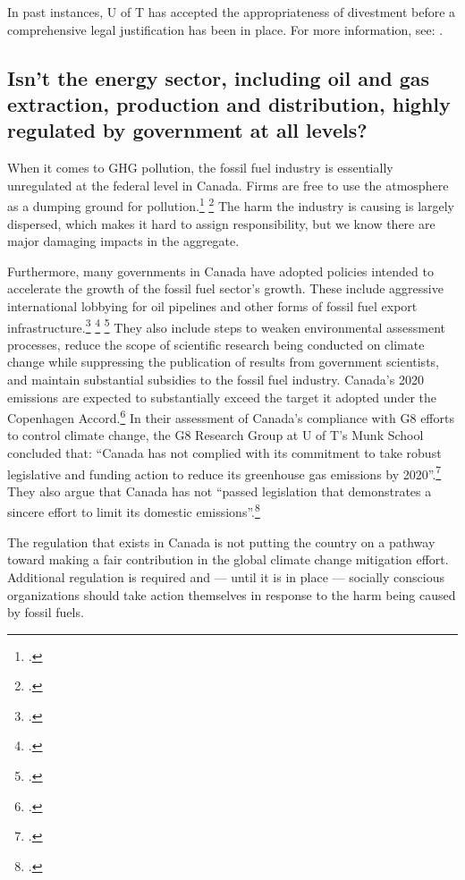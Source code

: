 \documentclass[10pt]{article}
\begin{document}
In past instances, U of T has accepted the appropriateness of divestment before a comprehensive legal justification has been in place.
For more information, see: .


	
	\subsection{Isn't the energy sector, including oil and gas extraction, production and distribution, highly regulated by government at all levels?}
	\label{HeavilyRegulated}
	


When it comes to GHG pollution, the fossil fuel industry is essentially unregulated at the federal level in Canada.
Firms are free to use the atmosphere as a dumping ground for  pollution.\footcite[See: ][]{Paris2013} \footcite[See also: ][]{Stewart2013}
The harm the industry is causing is largely dispersed, which makes it hard to assign responsibility, but we know there are major damaging impacts in the aggregate.



Furthermore, many governments in Canada have adopted policies intended to accelerate the growth of the fossil fuel sector's growth.
These include aggressive international lobbying for oil pipelines and other forms of fossil fuel export infrastructure.\footcite[See, for example: ][]{KeystoneLobbyingHarder} \footcite[][]{HarperNoBrainer} \footcite[][]{OliverRadicalLetter}
They also include steps to weaken environmental assessment processes, reduce the scope of scientific research being conducted on climate change while suppressing the publication of results from government scientists, and maintain substantial subsidies to the fossil fuel industry.
Canada's 2020 emissions are expected to substantially exceed the target it adopted under the Copenhagen Accord.\footcite[][]{PartingtonCredibility2013}
In their assessment of Canada's compliance with G8 efforts to control climate change, the G8 Research Group at U of T's Munk School concluded that: ``Canada has not complied with its commitment to take robust legislative and funding action to reduce its greenhouse gas emissions by 2020''.\footcite[][p. 129]{ClarkeDomaradzki2011}
They also argue that Canada has not ``passed legislation that demonstrates a sincere effort to limit its domestic emissions''.\footcite[][p. 156]{ClarkeDomaradzki2011}



The regulation that exists in Canada is not putting the country on a pathway toward making a fair contribution in the global climate change mitigation effort.
Additional regulation is required and --- until it is in place --- socially conscious organizations should take action themselves in response to the harm being caused by fossil fuels.
\end{document}
